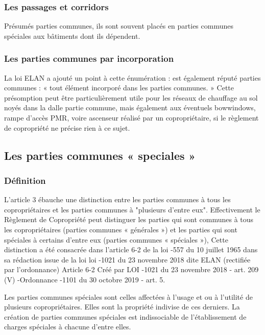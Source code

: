 		\subsubsection{Les passages et corridors}
		
		Présumés parties communes, ils sont souvent placés en parties communes spéciales aux bâtiments dont
		ils dépendent.
		
		\subsubsection{Les parties communes par incorporation}
		
		La loi ELAN a ajouté un point à cette énumération : est également réputé parties communes : « tout
		élément incorporé dans les parties communes. » Cette présomption peut être particulièrement utile pour
		les réseaux de chauffage au sol noyés dans la dalle partie commune, mais également aux éventuels bowwindows,
		rampe d’accès PMR, voire ascenseur réalisé par un copropriétaire, si le règlement de copropriété
		ne précise rien à ce sujet.
		
		\subsection{Les parties communes « speciales »}
		
		\subsubsection{Définition}
		
		L'article 3 ébauche une distinction entre les parties communes à tous les copropriétaires et les parties
		communes à "plusieurs d'entre eux". Effectivement le Règlement de Copropriété peut distinguer les
		parties qui sont communes à tous les copropriétaires (parties communes « générales ») et les parties qui
		sont spéciales à certains d'entre eux (parties communes « spéciales »),
		Cette distinction a été consacrée dans l’article 6-2 de la loi -557 du 10 juillet 1965 dans sa rédaction
		issue de la loi loi -1021 du 23 novembre 2018 dite ELAN (rectifiée par l’ordonnance)
		Article 6-2 Créé par LOI -1021 du 23 novembre 2018 - art. 209 (V) -Ordonnance -1101 du 30
		octobre 2019 - art. 5.
		
		Les parties communes spéciales sont celles affectées à l'usage et ou à l'utilité de plusieurs
		copropriétaires. Elles sont la propriété indivise de ces derniers.
		La création de parties communes spéciales est indissociable de l'établissement de charges spéciales à
		chacune d'entre elles.
		

